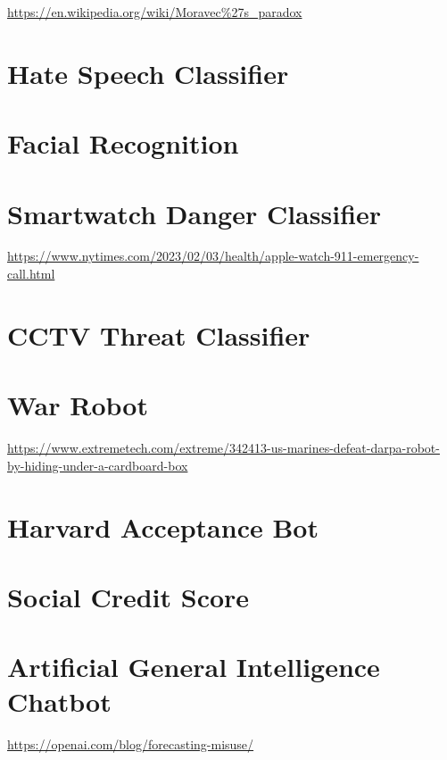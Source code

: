 \url{https://en.wikipedia.org/wiki/Moravec\%27s_paradox}

\section{Hate Speech Classifier}
\section{Facial Recognition}
\section{Smartwatch Danger Classifier} 

\url{https://www.nytimes.com/2023/02/03/health/apple-watch-911-emergency-call.html}

\section{CCTV Threat Classifier}
\section{War Robot}

\url{https://www.extremetech.com/extreme/342413-us-marines-defeat-darpa-robot-by-hiding-under-a-cardboard-box}

\section{Harvard Acceptance Bot}
\section{Social Credit Score}
\section{Artificial General Intelligence Chatbot}

\url{https://openai.com/blog/forecasting-misuse/}
